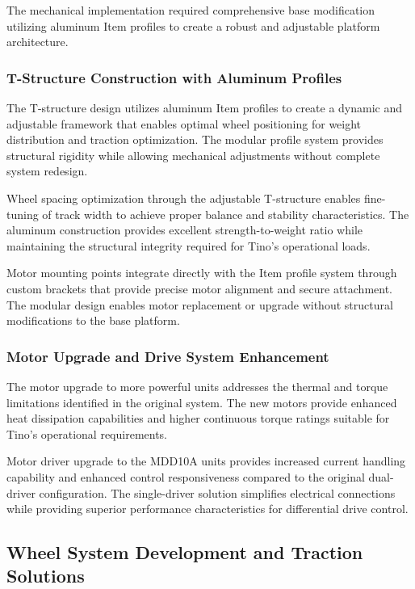 The mechanical implementation required comprehensive base modification utilizing aluminum Item profiles to create a robust and adjustable platform architecture.

\subsubsection{T-Structure Construction with Aluminum Profiles}

The T-structure design utilizes aluminum Item profiles to create a dynamic and adjustable framework that enables optimal wheel positioning for weight distribution and traction optimization. The modular profile system provides structural rigidity while allowing mechanical adjustments without complete system redesign.

Wheel spacing optimization through the adjustable T-structure enables fine-tuning of track width to achieve proper balance and stability characteristics. The aluminum construction provides excellent strength-to-weight ratio while maintaining the structural integrity required for Tino's operational loads.

Motor mounting points integrate directly with the Item profile system through custom brackets that provide precise motor alignment and secure attachment. The modular design enables motor replacement or upgrade without structural modifications to the base platform.

\subsubsection{Motor Upgrade and Drive System Enhancement}

The motor upgrade to more powerful units addresses the thermal and torque limitations identified in the original system. The new motors provide enhanced heat dissipation capabilities and higher continuous torque ratings suitable for Tino's operational requirements.

Motor driver upgrade to the MDD10A units provides increased current handling capability and enhanced control responsiveness compared to the original dual-driver configuration. The single-driver solution simplifies electrical connections while providing superior performance characteristics for differential drive control.

\subsection{Wheel System Development and Traction Solutions}

